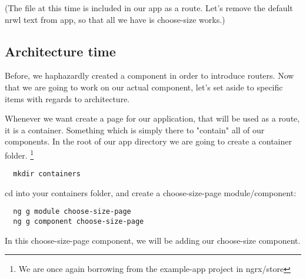 (The file at this time is included in our app as a route. Let's remove the
default nrwl text from app, so that all we have is choose-size works.)

\subsection{Architecture time}

Before, we haphazardly created a component in order to introduce routers. Now
that we are going to work on our actual component, let's set aside to specific
items with regards to architecture.

Whenever we want create a page for our application, that will be used as a
route, it is a container. Something which is simply there to "contain" all of
our components. In the root of our app directory we are going to create a
container folder. \footnote{We are once again borrowing from the example-app
project in ngrx/store}

\begin{verbatim}
  mkdir containers
\end{verbatim}

cd into your containers folder, and create a choose-size-page module/component:
\begin{verbatim}
  ng g module choose-size-page
  ng g component choose-size-page
\end{verbatim}

In this choose-size-page component, we will be adding our choose-size component.
